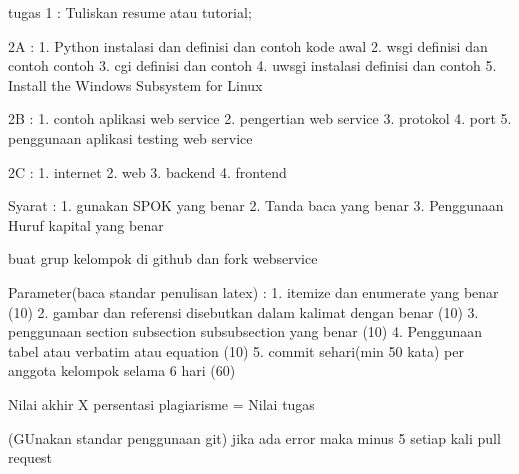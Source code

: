 tugas 1 :
Tuliskan resume atau tutorial;

2A :
1. Python instalasi dan definisi dan contoh kode awal
2. wsgi definisi dan contoh contoh
3. cgi definisi dan contoh
4. uwsgi instalasi definisi dan contoh
5. Install the Windows Subsystem for Linux


2B :
1. contoh aplikasi web service
2. pengertian web service
3. protokol
4. port
5. penggunaan aplikasi testing web service


2C :
1. internet
2. web
3. backend
4. frontend

Syarat :
1. gunakan SPOK yang benar
2. Tanda baca yang benar
3. Penggunaan Huruf kapital yang benar

buat grup kelompok di github dan fork webservice

Parameter(baca standar penulisan latex) :
1. itemize dan enumerate yang benar (10)
2. gambar dan referensi disebutkan dalam kalimat dengan benar (10)
3. penggunaan section subsection subsubsection yang benar (10)
4. Penggunaan tabel atau verbatim atau equation (10)
5. commit sehari(min 50 kata) per anggota kelompok selama 6 hari (60)

Nilai akhir X persentasi plagiarisme = Nilai tugas

(GUnakan standar penggunaan git)
jika ada error maka minus 5 setiap kali pull request